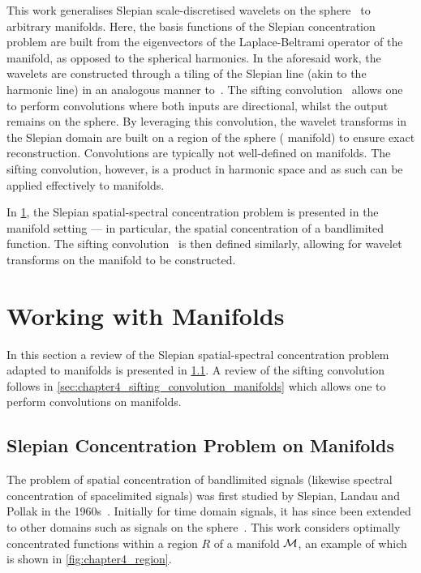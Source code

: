 This work generalises Slepian scale-discretised wavelets on the sphere~\cite{Roddy2021a} to arbitrary manifolds.
Here, the basis functions of the Slepian concentration problem are built from the eigenvectors of the Laplace-Beltrami operator of the manifold, as opposed to the spherical harmonics.
In the aforesaid work, the wavelets are constructed through a tiling of the Slepian line (akin to the harmonic line) in an analogous manner to~\cite{Wiaux2008,McEwen2018}.
The sifting convolution~\cite{Roddy2021} allows one to perform convolutions where both inputs are directional, whilst the output remains on the sphere.
By leveraging this convolution, the wavelet transforms in the Slepian domain are built on a region of the sphere (\cf{} manifold) to ensure exact reconstruction.
Convolutions are typically not well-defined on manifolds.
The sifting convolution, however, is a product in harmonic space and as such can be applied effectively to manifolds.

In \cref{sec:chapter4_working_with_manifolds}, the Slepian spatial-spectral concentration problem is presented in the manifold setting --- in particular, the spatial concentration of a bandlimited function.
The sifting convolution~\cite{Roddy2021} is then defined similarly, allowing for wavelet transforms on the manifold to be constructed.

\section{Working with Manifolds}\label{sec:chapter4_working_with_manifolds}

In this section a review of the Slepian spatial-spectral concentration problem adapted to manifolds is presented in \cref{sec:chapter4_slepian_concentration_problem_manifolds}.
A review of the sifting convolution follows in \cref{sec:chapter4_sifting_convolution_manifolds} which allows one to perform convolutions on manifolds.

\subsection{Slepian Concentration Problem on Manifolds}\label{sec:chapter4_slepian_concentration_problem_manifolds}

The problem of spatial concentration of bandlimited signals (likewise spectral concentration of spacelimited signals) was first studied by Slepian, Landau and Pollak in the 1960s~\cite{Slepian1961,Landau1961,Landau1962}.
Initially for time domain signals, it has since been extended to other domains such as signals on the sphere~\cite{Simons2006,Roddy2021a,Xu1983,Wieczorek2005}.
This work considers optimally concentrated functions within a region \(R\) of a manifold \(\mathcal{M}{}\), an example of which is shown in \cref{fig:chapter4_region}.

